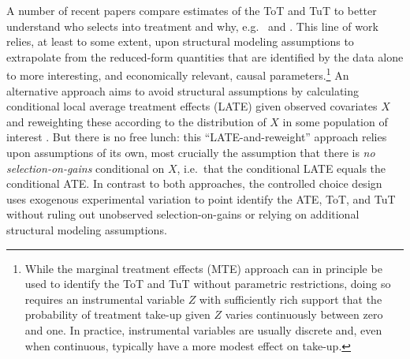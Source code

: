 \documentclass[oneside,11pt]{article}
\begin{document}
A number of recent papers compare estimates of the ToT and TuT to better understand who selects into treatment and why, e.g.\ \cite{cornelissen2018benefits} and \cite{Walters}. 
This line of work relies, at least to some extent, upon structural modeling assumptions to extrapolate from the reduced-form quantities that are identified by the data alone to more interesting, and economically relevant, causal parameters.\footnote{While the marginal treatment effects (MTE) approach \citep{heckman2007econometric} can in principle be used to identify the ToT and TuT without parametric restrictions, doing so requires an instrumental variable $Z$ with sufficiently rich support that the probability of treatment take-up given $Z$ varies continuously between zero and one. In practice, instrumental variables are usually discrete and, even when continuous, typically have a more modest effect on take-up.} 
An alternative approach aims to avoid structural assumptions by calculating conditional local average treatment effects (LATE) given observed covariates $X$ and reweighting these according to the distribution of $X$ in some population of interest \citep{aronow2013beyond,angrist2013extrapolate}. 
But there is no free lunch: this ``LATE-and-reweight'' approach relies upon assumptions of its own, most crucially the assumption that there is \emph{no selection-on-gains} conditional on $X$, i.e.\ that the conditional LATE equals the conditional ATE. 
In contrast to both approaches, the controlled choice design uses exogenous experimental variation to point identify the ATE, ToT, and TuT without ruling out unobserved selection-on-gains or relying on additional structural modeling assumptions.
\end{document}

